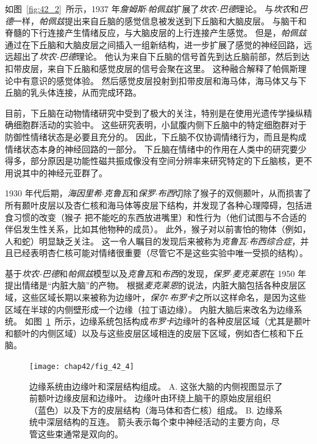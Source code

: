 如图~\ref{fig:42_2}~所示，1937 年\textit{詹姆斯$\cdot$帕佩兹}扩展了\textit{坎农-巴德}理论。
与\textit{坎农}和\textit{巴德}一样，\textit{帕佩兹}提出来自丘脑的感觉信息被发送到下丘脑和大脑皮层。
与脑干和脊髓的下行连接产生情绪反应，与大脑皮层的上行连接产生感觉。
但是，\textit{帕佩兹}通过在下丘脑和大脑皮层之间插入一组新结构，进一步扩展了感觉的神经回路，远远超出了\textit{坎农-巴德}理论。
他认为来自下丘脑的信号首先到达丘脑前部，然后到达扣带皮层，来自下丘脑和感觉皮层的信号会聚在这里。
这种融合解释了帕佩斯理论中有意识的感觉体验。
然后感觉皮层投射到扣带皮层和海马体，海马体又与下丘脑的乳头体连接，从而完成环路。


目前，下丘脑在动物情绪研究中受到了极大的关注，特别是在使用光遗传学操纵精确细胞群活动的实验中。
这些研究表明，小鼠腹内侧下丘脑中的特定细胞群对于防御性情绪状态是必要且充分的。
因此，下丘脑不仅协调情绪行为，而且是构成情绪状态本身的神经回路的一部分。
下丘脑在情绪中的作用在人类中的研究要少得多，部分原因是功能性磁共振成像没有空间分辨率来研究特定的下丘脑核，更不用说其中的神经元亚群了。


1930 年代后期，\textit{海因里希$\cdot$克鲁瓦}和\textit{保罗$\cdot$布西}切除了猴子的双侧颞叶，从而损害了所有颞叶皮层以及杏仁核和海马体等皮层下结构，并发现了各种心理障碍，包括进食习惯的改变（猴子 把不能吃的东西放进嘴里）和性行为（他们试图与不合适的伴侣发生性关系，比如其他物种的成员）。
此外，猴子对以前害怕的物体（例如，人和蛇）明显缺乏关注。
这一令人瞩目的发现后来被称为\textit{克鲁瓦$\cdot$布西综合症}，并且已经表明杏仁核可能对情绪很重要（尽管它不是这些实验中唯一受损的结构）。


基于\textit{坎农-巴德}和\textit{帕佩兹}模型以及\textit{克鲁瓦}和\textit{布西}的发现，\textit{保罗$\cdot$麦克莱恩}在 1950 年提出情绪是“内脏大脑”的产物。
根据\textit{麦克莱恩}的说法，内脏大脑包括各种皮层区域，这些区域长期以来被称为边缘叶，\textit{保尔$\cdot$布罗卡}之所以这样命名，是因为这些区域在半球的内侧壁形成一个边缘（拉丁语边缘）。
内脏大脑后来改名为边缘系统。
如图~\ref{fig:42_4}~所示，边缘系统包括构成\textit{布罗卡}边缘叶的各种皮层区域（尤其是颞叶和额叶的内侧区域）以及与这些皮层区域相连的皮层下区域，例如杏仁核和下丘脑。


\begin{figure}[htbp]
	\centering
	\texttt{[image: chap42/fig\_42\_4]}
	\caption{边缘系统由边缘叶和深层结构组成\cite{nieuwenhuys2007human}。
		A. 这张大脑的内侧视图显示了前额叶边缘皮层和边缘叶。
		边缘叶由环绕上脑干的原始皮层组织（蓝色）以及下方的皮层结构（海马体和杏仁核）组成。
		B. 边缘系统中深层结构的互连。
		箭头表示每个束中神经活动的主要方向，尽管这些束通常是双向的。}
	\label{fig:42_4}
\end{figure}


